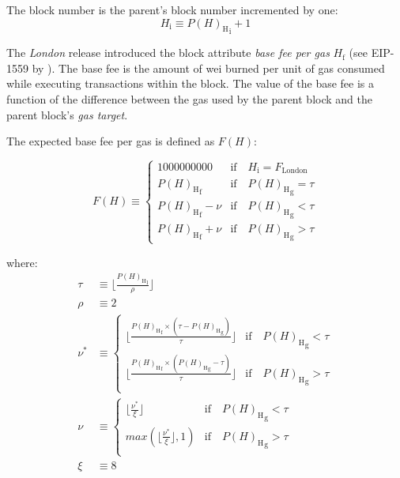 \documentclass[9pt,oneside]{amsart}
\makeatletter
\newcommand{\linkdest}[1]{\Hy@raisedlink{\hypertarget{#1}{}}}
\makeatother
\begin{document}
\begin{multicols}{2}
\hypertarget{block_number_H__i}{}The block number is the parent's block number incremented by one:
\begin{equation}
H_{\mathrm{i}} \equiv {{P(H)_{\mathrm{H}}}_{\mathrm{i}}} + 1
\end{equation}

\newcommand{\mindifficulty}{D_\mathrm{min}}
\newcommand{\homesteadmod}{\ensuremath{\varsigma_2}}
\newcommand{\expdiffsymb}{\ensuremath{\epsilon}}
\newcommand{\diffadjustment}{x}

\linkdest{H__f}The \textit{London} release introduced the block attribute \textit{base fee per gas} \hyperlink{block_baseFeePerGas_H__f}{$H_{\mathrm{f}}$} (see EIP-1559 by \cite{EIP-1559}).
The base fee is the amount of wei burned per unit of gas consumed while executing transactions within the block.
The value of the base fee is a function of the difference between the gas used by the parent block and the parent block's \textit{gas target}.

The expected base fee per gas is defined as $F(H)$:

\begin{equation}
  F(H) \equiv \begin{cases} 
    1000000000  & \text{if} \quad H_{\mathrm{i}} = F_{\mathrm{London}} \\
    {P(H)_{\mathrm{H}}}_{\mathrm{f}}  & \text{if} \quad {P(H)_{\mathrm{H}}}_{\mathrm{g}} = \tau \\
    {P(H)_{\mathrm{H}}}_{\mathrm{f}} - \nu & \text{if} \quad {P(H)_{\mathrm{H}}}_{\mathrm{g}} < \tau \\
    {P(H)_{\mathrm{H}}}_{\mathrm{f}} + \nu & \text{if} \quad {P(H)_{\mathrm{H}}}_{\mathrm{g}} > \tau
  \end{cases}
  \end{equation}

where:
  \begin{align}
    \tau &\equiv \lfloor\frac{{P(H)_{\mathrm{H}}}_{\mathrm{l}}}{\rho} \rfloor \\
    \rho &\equiv 2 \\
    \nu^* &\equiv \begin{cases}
      \lfloor \frac{{P(H)_{\mathrm{H}}}_{\mathrm{f}} \times ({\tau - P(H)_{\mathrm{H}}}_{\mathrm{g}})}{\tau} \rfloor &  \text{if} \quad {P(H)_{\mathrm{H}}}_{\mathrm{g}} < \tau \\
      \lfloor \frac{{P(H)_{\mathrm{H}}}_{\mathrm{f}} \times ({P(H)_{\mathrm{H}}}_{\mathrm{g}} - \tau)}{\tau} \rfloor &  \text{if} \quad {P(H)_{\mathrm{H}}}_{\mathrm{g}} > \tau \\
  \end{cases} \\
  \nu &\equiv \begin{cases}
    \lfloor \frac{\nu^*}{\xi} \rfloor &  \text{if} \quad {P(H)_{\mathrm{H}}}_{\mathrm{g}} < \tau \\
    max(\lfloor \frac{\nu^*}{\xi} \rfloor, 1) &  \text{if} \quad {P(H)_{\mathrm{H}}}_{\mathrm{g}} > \tau \\
  \end{cases} \\
  \xi &\equiv 8
\end{align}


\end{multicols}
\end{document}
